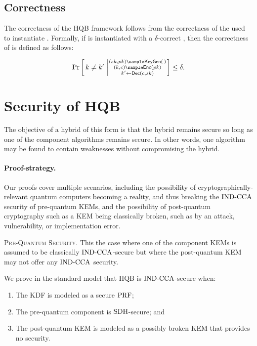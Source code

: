 \documentclass{article}
\begin{document}
        \subsection{Correctness}

        The correctness of the HQB framework follows from the correctness of the \kem used to instantiate \hqb.
        Formally, if \hqb is instantiated with a $\delta$-correct \kem, then the correctness of \hqb is defined as follows:

        \[
            \Pr \left[\,  k \ne k' \, \left | \substack{(\sk, \pk) \sample \keygen(\,) \\ (k, c) \sample \enc(\pk) \\ k' \gets \dec(c, \sk) } \right. \right] \le \delta .
        \]


        \section{Security of HQB}\label{sec:hqb-proofs}

        The objective of a hybrid of this form is that the hybrid remains secure so
        long as one of the component algorithms remains secure. In other words, one
        algorithm may be found to contain weaknesses without compromising the hybrid.

        \paragraph{Proof-strategy.}

        Our proofs cover multiple scenarios, including the possibility of
        cryptographically-relevant quantum computers becoming a reality, and thus
        breaking the $\text{IND-CCA}$ security of pre-quantum KEMs, and the possibility of
        post-quantum cryptography such as a KEM being classically broken, such as by
        an attack, vulnerability, or implementation error.

        \medskip \noindent
        \textsc{Pre-Quantum Security.} This the case where one of the component
        KEMs is assumed to be classically $\text{IND-CCA}$-secure but where the post-quantum
        KEM may not offer any $\text{IND-CCA}$ security.

        We prove in the standard model that HQB is $\text{IND-CCA}$-secure when:
        \begin{enumerate}
        \item The KDF is modeled as a secure $\text{PRF}$;
        \item The pre-quantum component is $\text{SDH}$-secure; and
        \item The post-quantum KEM is modeled as a possibly broken KEM that provides no security.
        \end{enumerate}
\end{document}
